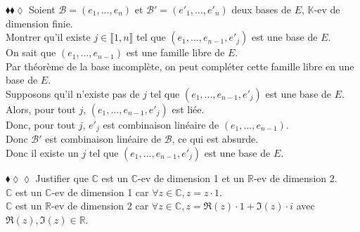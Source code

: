 \documentclass[11pt]{article}
\newcommand*{\R}{\mathbb{R}}
\newcommand*{\C}{\mathbb{C}}
\newcommand*{\K}{\mathbb{K}}
\newcommand*{\m}{\mathcal}
\begin{document}
\begin{exercise}{$\blacklozenge\blacklozenge\lozenge$}{}
    Soient $\m{B}=(e_1, ..., e_n)$ et $\m{B}'=(e'_1,...,e'_n)$ deux bases de $E$, $\K$-ev de dimension finie.\\
    Montrer qu'il existe $j\in\llbracket1,n\rrbracket$ tel que $(e_1, ..., e_{n-1}, e'_j)$ est une base de $E$.
    \tcblower\\[0.2cm]
    On sait que $(e_1, ..., e_{n-1})$ est une famille libre de $E$.\\
    Par théorème de la base incomplète, on peut compléter cette famille libre en une base de $E$.\\
    Supposons qu'il n'existe pas de $j$ tel que $(e_1, ..., e_{n-1}, e'_j)$ est une base de $E$.\\
    Alors, pour tout $j$, $(e_1, ..., e_{n-1}, e'_j)$ est liée.\\
    Donc, pour tout $j$, $e'_j$ est combinaison linéaire de $(e_1, ..., e_{n-1})$.\\
    Donc $\m{B}'$ est combinaison linéaire de $\m{B}$, ce qui est absurde.\\
    Donc il existe un $j$ tel que $(e_1, ..., e_{n-1}, e'_j)$ est une base de $E$.
\end{exercise}

\begin{exercise}{$\blacklozenge\lozenge\lozenge$}{}
    Justifier que $\C$ est un $\C$-ev de dimension 1 et un $\R$-ev de dimension 2.
    \tcblower\\[0.2cm]
    $\C$ est un $\C$-ev de dimension 1 car $\forall z \in \C, z = z \cdot 1$.\\
    $\C$ est un $\R$-ev de dimension 2 car $\forall z \in \C, z = \Re(z) \cdot 1 + \Im(z) \cdot i$ avec $\Re(z), \Im(z) \in \R$.
\end{exercise}
\end{document}
